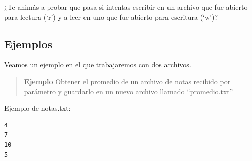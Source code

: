 \documentclass[
  letterpaper,
  DIV=11,
  numbers=noendperiod]{scrreprt}
\begin{document}
\begin{tcolorbox}[enhanced jigsaw, opacitybacktitle=0.6, toptitle=1mm, toprule=.15mm, arc=.35mm, breakable, bottomrule=.15mm, opacityback=0, leftrule=.75mm, rightrule=.15mm, title=\textcolor{quarto-callout-tip-color}{\faLightbulb}\hspace{0.5em}{Tip}, left=2mm, bottomtitle=1mm, colframe=quarto-callout-tip-color-frame, colback=white, titlerule=0mm, coltitle=black, colbacktitle=quarto-callout-tip-color!10!white]

¿Te animás a probar que pasa si intentas escribir en un archivo que fue
abierto para lectura (`r') y a leer en uno que fue abierto para
escritura (`w')?

\end{tcolorbox}

\subsection{Ejemplos}\label{ejemplos-1}

Veamos un ejemplo en el que trabajaremos con dos archivos.

\begin{quote}
\textbf{Ejemplo} Obtener el promedio de un archivo de notas recibido por
parámetro y guardarlo en un nuevo archivo llamado ``promedio.txt''
\end{quote}

Ejemplo de notas.txt:

\begin{verbatim}
4
7
10
5
\end{verbatim}
\end{document}
